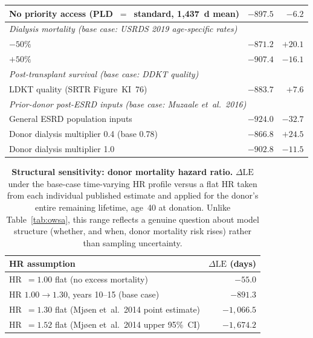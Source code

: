 \begin{table}[!ht]
\begin{tabular}{lrr}
	\quad No priority access (PLD~$=$~standard, 1{,}437~d mean) & $-897.5$ & $-6.2$ \\
	\midrule
	\multicolumn{3}{l}{\textit{Dialysis mortality (base case: USRDS 2019 age-specific rates)}} \\
	\quad $-50\%$ & $-871.2$ & $+20.1$ \\
	\quad $+50\%$ & $-907.4$ & $-16.1$ \\
	\midrule
	\multicolumn{3}{l}{\textit{Post-transplant survival (base case: DDKT quality)}} \\
	\quad LDKT quality (SRTR Figure~KI~76) & $-883.7$ & $+7.6$ \\
	\midrule
	\multicolumn{3}{l}{\textit{Prior-donor post-ESRD inputs (base case: Muzaale et~al.\ 2016)}} \\
	\quad General ESRD population inputs & $-924.0$ & $-32.7$ \\
	\quad Donor dialysis multiplier 0.4 (base 0.78) & $-866.8$ & $+24.5$ \\
	\quad Donor dialysis multiplier 1.0 & $-902.8$ & $-11.5$ \\
	\bottomrule
	\end{tabular}
\end{table}

\begin{table}[!ht]
	\centering
	\caption{\textbf{Structural sensitivity: donor mortality hazard ratio.} $\Delta\text{LE}$ under the base-case time-varying HR profile versus a flat HR taken from each individual published estimate and applied for the donor's entire remaining lifetime, age~40 at donation. Unlike Table~\ref{tab:owsa}, this range reflects a genuine question about model structure (whether, and when, donor mortality risk rises) rather than sampling uncertainty.}
	\label{tab:hr-structural}
	\begin{tabular}{lr}
	\toprule
	HR assumption & $\Delta\text{LE}$ (days) \\
	\midrule
	HR~$=1.00$ flat (no excess mortality) & $-55.0$ \\
	HR $1.00\rightarrow 1.30$, years 10--15 (base case) & $-891.3$ \\
	HR~$=1.30$ flat (Mjøen et~al.\ 2014 point estimate) & $-1{,}066.5$ \\
	HR~$=1.52$ flat (Mjøen et~al.\ 2014 upper 95\%~CI) & $-1{,}674.2$ \\
	\bottomrule
	\end{tabular}
\end{table}

\clearpage
\twocolumn